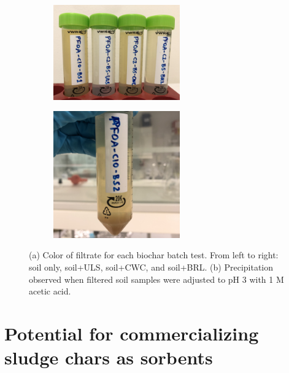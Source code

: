 \begin{figure}
    \centering
        \begin{subfigure}[t]{\linewidth}
            \centering
            \includegraphics[width=0.6\textwidth]{Bilder/Samples/Filtrate_DOC.JPG}
            \subcaption{}
            \label{fig:filtrate}
        \end{subfigure}
        \begin{subfigure}[]{\linewidth}
            \centering
            \includegraphics[width=0.6\textwidth]{Bilder/Samples/Precipitation.jpg}
            \subcaption{}
            \label{fig:precip}
        \end{subfigure}  
        \caption{(a) Color of filtrate for each biochar batch test. From left to right: soil only, soil+ULS, soil+CWC, and soil+BRL. (b) Precipitation observed when filtered soil samples were adjusted to pH 3 with 1 M acetic acid.}
        \label{fig:DOC_tubes}
\end{figure}

\section{Potential for commercializing sludge chars as sorbents}
